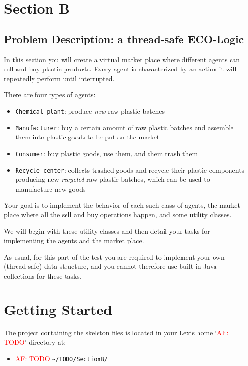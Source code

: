 \documentclass[a4wide,11pt]{article}
\renewcommand{\j}[1]{\texttt{#1}}
\newcommand{\AFComment}[1]{\textcolor{red}{AF: #1}}
\begin{document}
\section*{Section B}


\subsection*{Problem Description: a thread-safe ECO-Logic}

In this section you will create a virtual market place where different agents
can sell and buy plastic products.
Every agent is characterized by an action it will repeatedly perform until
interrupted.


There are four types of agents:
\begin{itemize}
	\item \j{Chemical plant}: produce \emph{new} raw plastic batches
	\item \j{Manufacturer}: buy a certain amount of raw plastic batches and
assemble them into plastic goods to be put on the market
	\item \j{Consumer}: buy plastic goods, use them, and them trash them
	\item \j{Recycle center}: collects trashed goods and recycle their plastic
components producing new \emph{recycled} raw plastic batches, which can be used
to manufacture new goods
\end{itemize}

Your goal is to implement the behavior of each such class of agents, the market
place where all the sell and buy operations happen, and some utility classes.

We will begin with these utility classes and then detail your tasks for 
implementing the agents and the market place.

As usual, for this part of the test you are required to implement your own
(thread-safe) data structure, and you cannot therefore use built-in Java
collections for these tasks.

\section*{Getting Started}

The project containing the skeleton files is located in your Lexis home
`\AFComment{TODO}' directory at:

\begin{itemize}
\item \AFComment{TODO} \j{\textasciitilde/TODO/SectionB/}
\end{itemize}
\end{document}
